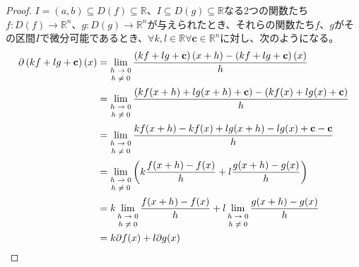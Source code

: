 \documentclass[dvipdfmx]{jsarticle}
\begin{document}
\begin{proof}
$I = (a,b) \subseteq D(f) \subseteq \mathbb{R}$、$I \subseteq D(g) \subseteq \mathbb{R}$なる2つの関数たち$f:D(f) \rightarrow \mathbb{R}^{n}$、$g:D(g) \rightarrow \mathbb{R}^{n}$が与えられたとき、それらの関数たち$f$、$g$がその区間$I$で微分可能であるとき、$\forall k,l \in \mathbb{R}\forall\mathbf{c} \in \mathbb{R}^{n}$に対し、次のようになる。
\begin{align*}
\partial\left( kf + lg + \mathbf{c} \right)(x) &= \lim_{\scriptsize \begin{matrix}
h \rightarrow 0 \\
h \neq 0 \\
\end{matrix}}\frac{\left( kf + lg + \mathbf{c} \right)(x + h) - \left( kf + lg + \mathbf{c} \right)(x)}{h}\\
&= \lim_{\scriptsize \begin{matrix}
h \rightarrow 0 \\
h \neq 0 \\
\end{matrix}}\frac{\left( kf(x + h) + lg(x + h) + \mathbf{c} \right) - \left( kf(x) + lg(x) + \mathbf{c} \right)}{h}\\
&= \lim_{\scriptsize \begin{matrix}
h \rightarrow 0 \\
h \neq 0 \\
\end{matrix}}\frac{kf(x + h) - kf(x) + lg(x + h) - lg(x) + \mathbf{c} - \mathbf{c}}{h}\\
&= \lim_{\scriptsize \begin{matrix}
h \rightarrow 0 \\
h \neq 0 \\
\end{matrix}}\left( k\frac{f(x + h) - f(x)}{h} + l\frac{g(x + h) - g(x)}{h} \right)\\
&= k\lim_{\scriptsize \begin{matrix}
h \rightarrow 0 \\
h \neq 0 \\
\end{matrix}}\frac{f(x + h) - f(x)}{h} + l\lim_{\scriptsize \begin{matrix}
h \rightarrow 0 \\
h \neq 0 \\
\end{matrix}}\frac{g(x + h) - g(x)}{h}\\
&= k\partial f(x) + l\partial g(x)\\

\end{align*}
\end{proof}
\end{document}
